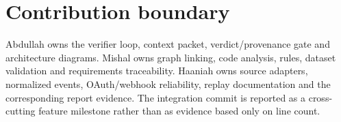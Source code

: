 \section{Contribution boundary}

Abdullah owns the verifier loop, context packet, verdict/provenance gate and
architecture diagrams. Mishal owns graph linking, code analysis, rules,
dataset validation and requirements traceability. Haaniah owns source
adapters, normalized events, OAuth/webhook reliability, replay documentation
and the corresponding report evidence. The integration commit is reported as
a cross-cutting feature milestone rather than as evidence based only on line
count.
